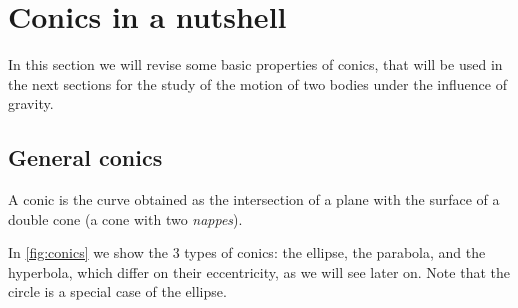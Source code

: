 \documentclass[../main.tex]{subfiles}
\begin{document}
\section{Conics in a nutshell}
In this section we will revise some basic properties of conics, that will be used in the next sections for the study of the motion of two bodies under the influence of gravity.
\subsection{General conics}
\begin{definition}
  A conic is the curve obtained as the intersection of a plane with the surface of a double cone (a cone with two \emph{nappes}).
\end{definition}
In \cref{fig:conics} we show the 3 types of conics: the ellipse, the parabola, and the hyperbola, which differ on their eccentricity, as we will see later on. Note that the circle is a special case of the ellipse.
\end{document}
